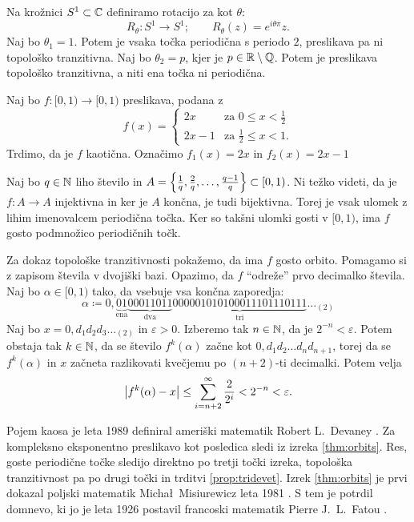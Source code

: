 \begin{zgled}
    Na krožnici \(S^1 \subset \mathbb C\) definiramo rotacijo za kot \(\theta\):
    \[R_\theta \colon S^1 \to S^1; \qquad R_\theta (z) = e^{i \theta \pi} z.\]
    Naj bo \(\theta_1 = 1\). Potem je vsaka točka periodična s periodo \(\num{2}\), preslikava pa ni topološko  tranzitivna. Naj bo \(\theta_2 = p\), kjer je \(p \in \mathbb R \setminus \mathbb Q\). Potem je preslikava topološko tranzitivna, a niti ena točka ni periodična.
\end{zgled}

\begin{zgled} \label{ex:double}
    Naj bo \(f \colon [0, 1) \to [0, 1)\) preslikava, podana z
    \[
        f (x) =
        \begin{cases}
            2x     & \text{za } 0 \leq x < \frac{1}{2}  \\
            2x - 1 & \text{za } \frac{1}{2} \leq x < 1.
        \end{cases}
    \]
    Trdimo, da je \(f\) kaotična. Označimo \(f_1 (x) = 2 x\) in \(f_2 (x) = 2x - 1\)

    Naj bo \(q \in \mathbb N\) liho število in \(A = \left\{ \frac{1}{q}, \frac{2}{q}, \dots, \frac{q - 1}{q} \right\} \subset [0, 1)\). Ni težko videti, da je \(f \colon A \to A\) injektivna in ker je \(A\) končna, je tudi bijektivna. Torej je vsak ulomek z lihim imenovalcem periodična točka. Ker so takšni ulomki gosti v \([0, 1)\), ima \(f\) gosto podmnožico periodičnih točk.

    Za dokaz topološke tranzitivnosti pokažemo, da ima \(f\) gosto orbito. Pomagamo si z zapisom števila v dvojiški bazi. Opazimo, da \(f\) ``odreže'' prvo decimalko števila. Naj bo \(\alpha \in [0, 1)\) tako, da vsebuje vsa končna zaporedja:
    \[\alpha \coloneq 0, \underbrace{0 1}_{\text{ena}} \underbrace{00011011}_{\text{dva}} \underbrace{000 001 010 100 011 101 110 111}_{\text{tri}} \dots_{(2)}\]
    Naj bo \(x = 0, d_1 d_2 d_3 \dots_{(2)}\) in \(\varepsilon > 0\). Izberemo tak \(n \in \mathbb N\), da je \(2^{- n} < \varepsilon\). Potem obstaja tak \(k \in \mathbb N\), da se število \(f^k (\alpha)\) začne kot \(0, d_1 d_2 \dots d_n d_{n + 1}\), torej da se \(f^k (\alpha)\) in \(x\) začneta razlikovati kvečjemu po \((n + 2)\)-ti decimalki. Potem velja
    \[\left\lvert f^k (\alpha) - x\right\rvert \leq \sum_{i = n + 2}^{\infty} \frac{2}{2^{i}} < 2^{- n} < \varepsilon.\]
\end{zgled}

\noindent Pojem kaosa je leta \num{1989} definiral ameriški matematik Robert L.~Devaney \cite{Devaney_1986}. Za kompleksno eksponentno preslikavo kot posledica sledi iz izreka \ref{thm:orbits}. Res, goste periodične točke sledijo direktno po tretji točki izreka, topološka tranzitivnost pa po drugi točki in trditvi \ref{prop:tridevet}. Izrek \ref{thm:orbits} je prvi dokazal poljski matematik Micha\l\ Misiurewicz leta \num{1981} \cite{Misiurewicz_1981}. S tem je potrdil domnevo, ki jo je leta \num{1926} postavil francoski matematik Pierre J.~L.~Fatou \cite{Fatou_1926}.

